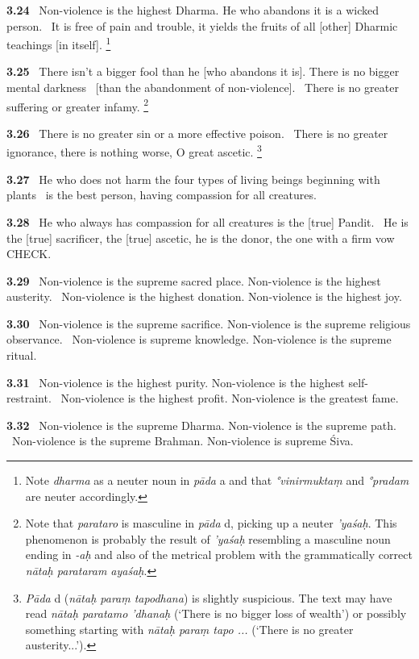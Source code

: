\documentclass{article}
\newcommand{\skt}[1]{\textit{#1}}
\begin{document}
\textbf{3.24}%
\ Non-violence is the highest Dharma. He who abandons it is a wicked person.%
\ It is free of pain and trouble, it yields the fruits of all [other] Dharmic teachings [in itself].%
\footnote{Note \skt{dharma} as a neuter noun in \skt{pāda} a and that \skt{°vinirmuktaṃ} and                        \skt{°pradam} are neuter accordingly. }%


\textbf{3.25}%
\ There isn't a bigger fool than he [who abandons it is]. There is no bigger mental darkness%
\                                 [than the abandonment of non-violence].%
\ There is no greater suffering or greater infamy.%
\footnote{Note that \skt{parataro} is masculine in \skt{pāda} d, picking up a neuter \skt{'yaśaḥ}.        This phenomenon is probably the result of \skt{'yaśaḥ} resembling a masculine noun ending in \skt{-aḥ}                and also of the metrical problem with the grammatically correct                        \skt{nātaḥ parataram ayaśaḥ}. }%


\textbf{3.26}%
\ There is no greater sin or a more effective poison.%
\ There is no greater ignorance, there is nothing worse, O great ascetic.%
\footnote{\skt{Pāda} d (\skt{nātaḥ paraṃ tapodhana}) is slightly suspicious. The text may have read \skt{nātaḥ paratamo 'dhanaḥ}         (`There is no bigger loss of wealth') or possibly something starting with                \skt{nātaḥ paraṃ tapo ...} (`There is no greater austerity...'). }%


\textbf{3.27}%
\ He who does not harm the four types of living beings beginning with plants%
\ is the best person, having compassion for all creatures.%


\textbf{3.28}%
\ He who always has compassion for all creatures is the [true] Pandit.%
\ He is the [true] sacrificer, the [true] ascetic, he is the donor, the one with a firm vow CHECK.%


\textbf{3.29}%
\ Non-violence is the supreme sacred place. Non-violence is the highest austerity.%
\ Non-violence is the highest donation. Non-violence is the highest joy.%


\textbf{3.30}%
\ Non-violence is the supreme sacrifice. Non-violence is the supreme religious observance.%
\ Non-violence is supreme knowledge. Non-violence is the supreme ritual.%


\textbf{3.31}%
\ Non-violence is the highest purity. Non-violence is the highest self-restraint.%
\ Non-violence is the highest profit. Non-violence is the greatest fame.%


\textbf{3.32}%
\ Non-violence is the supreme Dharma. Non-violence is the supreme path.%
\ Non-violence is the supreme Brahman. Non-violence is supreme Śiva.%
\end{document}
